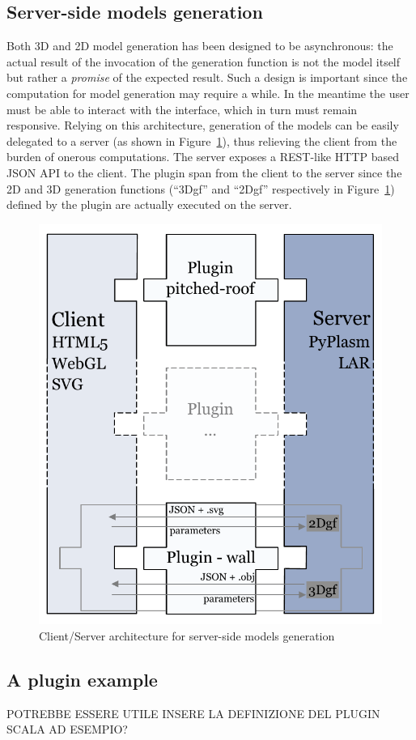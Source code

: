 \subsection{Server-side models generation}

\noindent Both 3D and 2D model generation has been designed to be asynchronous: the actual result of the invocation of the generation function is not the model itself but rather a \emph{promise} of the expected result. Such a design is important since the computation for model generation may require a while. In the meantime the user must be able to interact with the interface, which in turn must remain responsive. Relying on this architecture, generation of the models can be easily delegated to a server (as shown in Figure~\ref{fig:c-s-arch}), thus relieving the client from the burden of onerous computations. The server exposes a REST-like HTTP based JSON API to the client. The plugin span from the client to the server since the 2D and 3D generation functions (``3Dgf'' and ``2Dgf'' respectively in Figure~\ref{fig:c-s-arch}) defined by the plugin are actually executed on the server.

\begin{figure}[htbp] %
   \centering

   \includegraphics[width=0.6\linewidth]{images/architecture-h}

   \caption{Client/Server architecture for server-side models generation}
   \label{fig:c-s-arch}
\end{figure}

\subsection{A plugin example}

POTREBBE ESSERE UTILE INSERE LA DEFINIZIONE DEL PLUGIN SCALA AD ESEMPIO?



